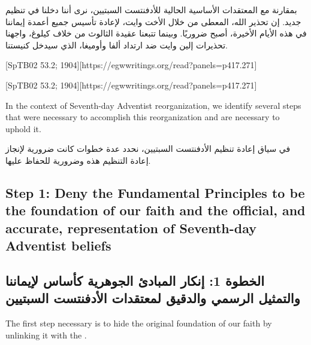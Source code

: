 بمقارنة  مع المعتقدات الأساسية الحالية للأدفنتست السبتيين، نرى أننا دخلنا في تنظيم جديد. إن تحذير الله، المعطى من خلال الأخت وايت، لإعادة تأسيس جميع أعمدة إيماننا في هذه الأيام الأخيرة، أصبح ضروريًا. وبينما تتبعنا عقيدة الثالوث من خلاف كيلوغ، واجهنا تحذيرات إلين وايت ضد ارتداد ألفا وأوميغا، الذي سيدخل كنيستنا.


[SpTB02 53.2; 1904][https://egwwritings.org/read?panels=p417.271]


[SpTB02 53.2; 1904][https://egwwritings.org/read?panels=p417.271]


In the context of Seventh-day Adventist reorganization, we identify several steps that were necessary to accomplish this reorganization and are necessary to uphold it.


في سياق إعادة تنظيم الأدفنتست السبتيين، نحدد عدة خطوات كانت ضرورية لإنجاز إعادة التنظيم هذه وضرورية للحفاظ عليها.


\subsection*{Step 1: Deny the Fundamental Principles to be the foundation of our faith and the official, and accurate, representation of Seventh-day Adventist beliefs}


\subsection*{الخطوة 1: إنكار المبادئ الجوهرية كأساس لإيماننا والتمثيل الرسمي والدقيق لمعتقدات الأدفنتست السبتيين}


The first step necessary is to hide the original foundation of our faith by unlinking it with the .


